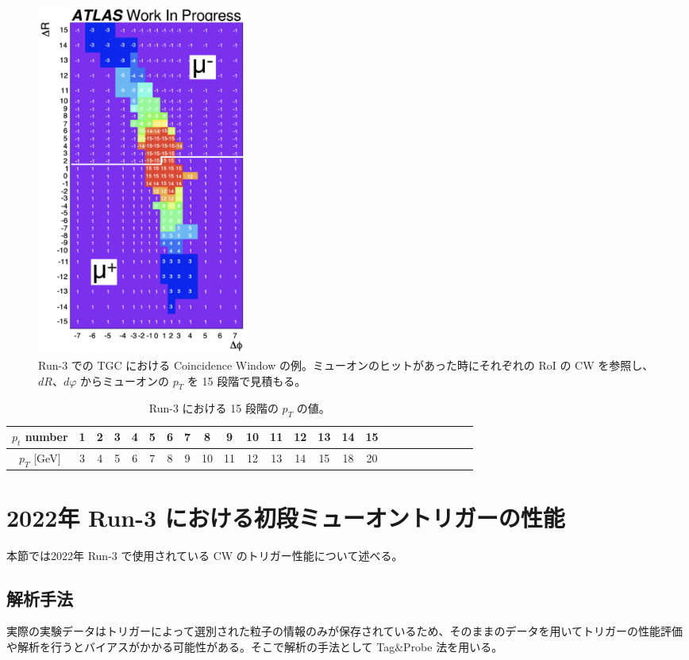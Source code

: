 \begin{figure}[tb]
  \centering
  \includegraphics[clip, width=7cm]{fig/3/cw_run3_shiomi.png}
  \caption{Run-3 での TGC における Coincidence Window の例。ミューオンのヒットがあった時にそれぞれの RoI の CW を参照し、$dR$、$dφ$ からミューオンの $p_T$ を 15 段階で見積もる。}
  \label{fig:CW}
\end{figure}

\begin{table}[tb]
    \caption{Run-3 における 15 段階の $p_T$ の値。}
    \label{pt_number}
    \centering
    \begin{tabular}{|c|c|c|c|c|c|c|c|c|c|c|c|c|c|c|c|c|c|c|c|c|c|c|c|}
        \hline
        $p_t$ number & 1 & 2 & 3 & 4 & 5 & 6 & 7 & 8 & 9 & 10 & 11 & 12 & 13 & 14 & 15\\
        \hline
        $p_T$ [GeV] & 3 & 4 & 5 & 6 & 7 & 8 & 9 & 10 & 11 & 12 & 13 & 14 & 15 & 18 & 20\\
        \hline
    \end{tabular}
\end{table}



\section{2022年 Run-3 における初段ミューオントリガーの性能}
本節では2022年 Run-3 で使用されている CW のトリガー性能について述べる。

\subsection{解析手法}
実際の実験データはトリガーによって選別された粒子の情報のみが保存されているため、そのままのデータを用いてトリガーの性能評価や解析を行うとバイアスがかかる可能性がある。そこで解析の手法として Tag$\&$Probe 法を用いる。

